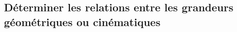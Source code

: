 \subsection{Déterminer les relations entre les grandeurs géométriques ou cinématiques}

\renewcommand{\repExo}{../../ExercicesCompetences/C2_MettreEnOeuvreDemarche/C2_06_Transmetteurs}

\renewcommand{\td}{21_TrainSimple}
\graphicspath{{\repStyle/png/}{\repExo/\td/images/}}


\renewcommand{\td}{22_TrainSimple}
\graphicspath{{\repStyle/png/}{\repExo/\td/images/}}


\renewcommand{\td}{23_TrainSimple}
\graphicspath{{\repStyle/png/}{\repExo/\td/images/}}


\renewcommand{\td}{24_TrainSimple}
\graphicspath{{\repStyle/png/}{\repExo/\td/images/}}


\renewcommand{\td}{25_Cheville}
\graphicspath{{\repStyle/png/}{\repExo/\td/images/}}

